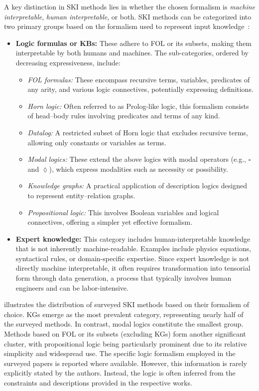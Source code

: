 %
A key distinction in \gls{SKI} methods lies in whether the chosen formalism is \emph{machine interpretable}, \emph{human interpretable}, or both.
%
\Gls{SKI} methods can be categorized into two primary groups based on the formalism used to represent input knowledge~\cite{DBLP:journals/csur/CiattoSAMO24}:
%
\begin{itemize}
    \item \textbf{Logic formulas or \glspl{KB}:} These adhere to \gls{FOL} or its subsets, making them interpretable by both humans and machines.
    The sub-categories, ordered by decreasing expressiveness, include:
    \begin{itemize}
        \item \emph{\gls{FOL} formulas:} These encompass recursive terms, variables, predicates of any arity, and various logic connectives, potentially expressing definitions.
        \item \emph{Horn logic:} Often referred to as Prolog-like logic, this formalism consists of head–body rules involving predicates and terms of any kind.
        \item \emph{Datalog:} A restricted subset of Horn logic that excludes recursive terms, allowing only constants or variables as terms.
        \item \emph{Modal logics:} These extend the above logics with modal operators (e.g., \(\square\) and \(\lozenge\)), which express modalities such as necessity or possibility.
        \item \emph{Knowledge graphs:} A practical application of description logics designed to represent entity–relation graphs.
        \item \emph{Propositional logic:} This involves Boolean variables and logical connectives, offering a simpler yet effective formalism.
    \end{itemize}
    \item \textbf{Expert knowledge:} This category includes human-interpretable knowledge that is not inherently machine-readable.
    Examples include physics equations, syntactical rules, or domain-specific expertise.
    Since expert knowledge is not directly machine interpretable, it often requires transformation into tensorial form through data generation, a process that typically involves human engineers and can be labor-intensive.
\end{itemize}
%
 illustrates the distribution of surveyed \gls{SKI} methods based on their formalism of choice.
%
\Glspl{KG} emerge as the most prevalent category, representing nearly half of the surveyed methods.
%
In contrast, modal logics constitute the smallest group.
%
Methods based on \gls{FOL} or its subsets (excluding \glspl{KG}) form another significant cluster, with propositional logic being particularly prominent due to its relative simplicity and widespread use.
%
The specific logic formalism employed in the surveyed papers is reported where available.
%
However, this information is rarely explicitly stated by the authors.
%
Instead, the logic is often inferred from the constraints and descriptions provided in the respective works.

